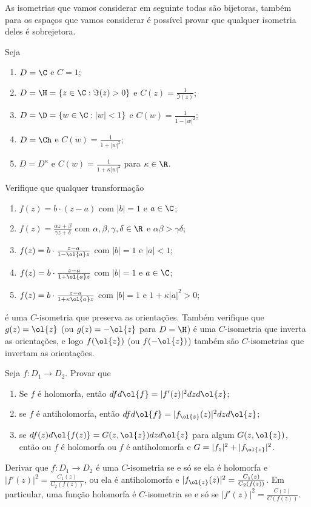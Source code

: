 As isometrias que vamos considerar em seguinte todas são bijetoras, também para os espaços que vamos considerar é possível provar
que qualquer isometria deles é sobrejetora.


\begin{problema}
Seja
\begin{enumerate}
\item $D = \C$ e $C=1$;
\item $D = \H = \{z\in\C: \Im(z)>0\}$ e $C(z)=\frac{1}{\Im(z)}$;
\item $D = \D = \{w\in\C: |w|<1\}$ e $C(w) = \frac{1}{1-|w|^2}$;
\item $D = \Ch$ e $C(w) = \frac{1}{1+|w|^2}$;
\item $D = D^\kappa$ e $C(w) = \frac{1}{1+\kappa|w|^2}$ para $\kappa\in\R$.
\end{enumerate}
Verifique que qualquer transformação 
\begin{enumerate}
\item $f(z) = b \cdot (z-a)$ com $|b|=1$ e $a\in\C$;
\item $f(z) = \frac{\alpha z+\beta}{\gamma z+\delta}$ com $\alpha,\beta,\gamma,\delta\in\R$ e $\alpha\beta>\gamma\delta$;
\item $f(z) = b \cdot \frac{z-a}{1-\ol{a}z}$ com $|b|=1$ e $|a|<1$;
\item $f(z) = b \cdot \frac{z-a}{1+\ol{a}z}$ com $|b|=1$ e $a\in\C$;
\item $f(z) = b \cdot \frac{z-a}{1+\kappa\ol{a}z}$ com $|b|=1$ e $1 + \kappa |a|^2 > 0$;
\end{enumerate}
é uma $C$-isometria que preserva as orientações.
Também verifique que $g(z) = \ol{z}$ (ou $g(z) = -\ol{z}$ para $D=\H$) é uma $C$-isometria que inverta as orientações,
e logo $f(\ol{z})$ (ou $f(-\ol{z})$) também são $C$-isometrias que invertam as orientações.
\end{problema}

\begin{problema}
Seja $f: D_1 \to D_2$.
Provar que
\begin{enumerate}
\item Se $f$ é holomorfa, então $df d\ol{f} = |f'(z)|^2 dz d\ol{z}$;
\item se $f$ é antiholomorfa, então $df d\ol{f} = |f_{\ol{z}}(z)|^2 dz d\ol{z}$;
\item se $df(z) d\ol{f(z)} = G(z,\ol{z}) dz d\ol{z}$ para algum $G(z,\ol{z})$,
então ou $f$ é holomorfa ou $f$ é antiholomorfa e $G = |f_z|^2 + |f_{\ol{z}}|^2$.
\end{enumerate}
Derivar que $f : D_1 \to D_2$ é uma $C$-isometria se e só se ela é holomorfa
e $|f'(z)|^2 = \frac{C_1(z)}{C_2(f(z))}$,
ou ela é antiholomorfa e $|f_{\ol{z}}(z)|^2 = \frac{C_1(z)}{C_2(f(z))}$.
Em particular, uma função holomorfa é $C$-isometria se e só se $|f'(z)|^2 = \frac{C(z)}{C(f(z))}$.
\end{problema}

